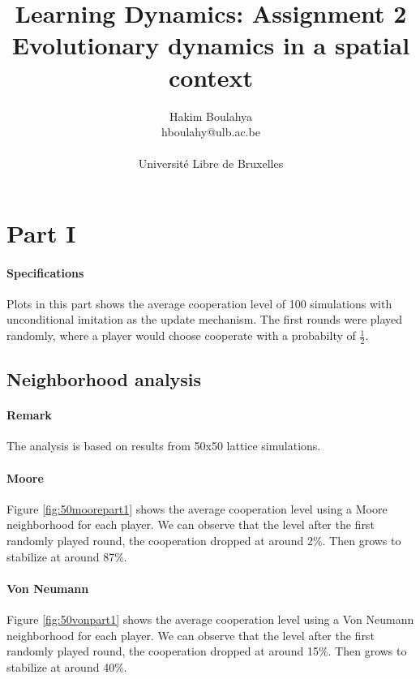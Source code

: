 \documentclass[letterpaper]{article}
\title{Learning Dynamics: Assignment 2 \\
\Large Evolutionary dynamics in a spatial context}
\author{\Large Hakim Boulahya \\
hboulahy@ulb.ac.be\\
\\
Université Libre de Bruxelles
}
\begin{document}
\maketitle
\tableofcontents
\newpage

\section{Part I}

\paragraph{Specifications}
Plots in this part shows the average cooperation level of 100
simulations with unconditional imitation as the update mechanism.
The first rounds were played randomly,
where a player would choose cooperate with a probabilty of $\frac{1}{2}$.

\subsection{Neighborhood analysis}

\label{neighborpart1}
\paragraph{Remark} The analysis is based on results from 50x50 lattice
simulations.

\paragraph{Moore}

Figure \ref{fig:50moorepart1} shows the average cooperation level
using a Moore neighborhood for each player.
We can observe that the level after the first randomly played round, the
cooperation dropped at around 2\%. Then grows to stabilize at around 87\%.

\paragraph{Von Neumann}

Figure \ref{fig:50vonpart1} shows the average cooperation level
using a Von Neumann neighborhood for each player.
We can observe that the level after the first randomly played round, the
cooperation dropped at around 15\%. Then grows to stabilize at around 40\%.

\paragraph{}
\end{document}

